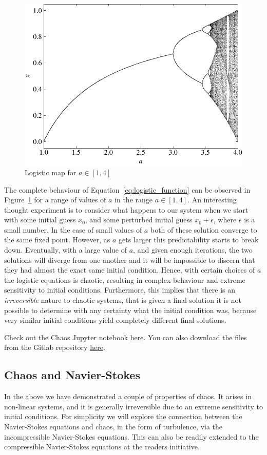 \begin{figure}[htbp]
	\centering
	\includegraphics[width=0.65\linewidth]{Pictures/logistic_map}
	\caption{Logistic map for $a\in[1,4]$}
	\label{fig:logistic_map}
\end{figure}
The complete behaviour of Equation~\ref{eq:logistic_function} can be observed in Figure~\ref{fig:logistic_map} for a range of values of $a$ in the range $a\in[1,4]$. An interesting thought experiment is to consider what happens to our system when we start with some initial guess $x_0$, and some perturbed initial guess $x_0 + \epsilon$, where $\epsilon$ is a small number. In the case of small values of $a$ both of these solution converge to the same fixed point. However, as $a$ gets larger this predictability starts to break down. Eventually, with a large value of $a$, and given enough iterations, the two solutions will diverge from one another and it will be impossible to discern that they had almost the exact same initial condition. Hence, with certain choices of $a$ the logistic equations is chaotic, resulting in complex behaviour and extreme sensitivity to initial conditions. Furthermore, this implies that there is an {\it irreversible} nature to chaotic systems, that is given a final solution it is not possible to determine with any certainty what the initial condition was, because very similar initial conditions yield completely different final solutions.
\begin{jupyternote}
	Check out the Chaos Jupyter notebook \href{\binderurl}{\underline{here}}. You can also download the files from the Gitlab repository \href{\repourl}{\underline{here}}.
\end{jupyternote}

\subsection{Chaos and Navier-Stokes}
In the above we have demonstrated a couple of properties of chaos. It arises in non-linear systems, and it is generally irreversible due to an extreme sensitivity to initial conditions. For simplicity we will explore the connection between the Navier-Stokes equations and chaos, in the form of turbulence, via the incompressible Navier-Stokes equations. This can also be readily extended to the compressible Navier-Stokes equations at the readers initiative.

